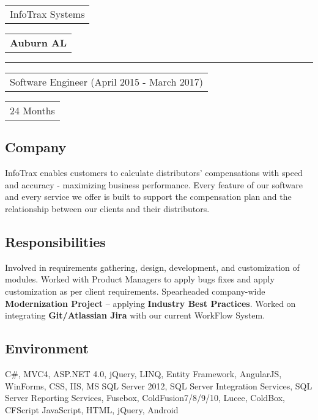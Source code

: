 \documentclass[letterpaper,10pt]{article}
\begin{document}
    \vspace{0.5cm}
    \noindent
    \begin{tabular}[t]{@{}l}
    \Large{InfoTrax Systems}
    \end{tabular}
    \hfill
    \begin{tabular}[t]{l@{}}
    \textbf{Auburn AL}
    \end{tabular}
    \noindent\rule{\textwidth}{0.5pt}
    \begin{tabular}[t]{@{}l}
    Software Engineer (April 2015 - March 2017)
    \end{tabular}
    \hfill
    \begin{tabular}[t]{l@{}}
    24 Months
    \end{tabular}

    \subsection{Company}
    InfoTrax enables customers to calculate distributors’ compensations with speed and accuracy - maximizing business performance. Every feature of our software and every service we offer is built to support the compensation plan and the relationship between our clients and their distributors.

    \subsection{Responsibilities}
    Involved in requirements gathering, design, development, and customization of modules. Worked with Product Managers to apply bugs fixes and apply customization as per client requirements. Spearheaded company-wide \textbf{Modernization Project} – applying \textbf{Industry Best Practices}. Worked on integrating \textbf{Git/Atlassian Jira} with our current WorkFlow System.

    \subsection{Environment}
    C\#, MVC4, ASP.NET 4.0, jQuery, LINQ, Entity Framework, AngularJS, WinForms, CSS, IIS, MS SQL Server 2012, SQL Server Integration Services, SQL Server Reporting Services, Fusebox, ColdFusion7/8/9/10, Lucee, ColdBox, CFScript JavaScript, HTML, jQuery, Android

    \newpage

\end{document}
